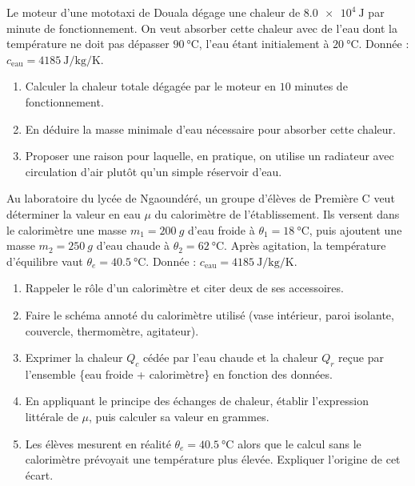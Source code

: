 \documentclass[11pt]{article}
\newcounter{popsec}
\newcounter{popsub}
\newcommand{\courssub}[1]{%
  \stepcounter{popsub}%
  \par\vspace{9pt}\noindent{\popxbold\fontsize{11.5}{13}\selectfont\color{popink}{\color{poporange}\thepopsec.\thepopsub}\hspace{6pt}#1}\par\nopagebreak\vspace{4pt}
}
\begin{document}
\begin{exercice}
Le moteur d'une mototaxi de Douala dégage une chaleur de $\SI{8,0e4}{\joule}$ par minute de fonctionnement. On veut absorber cette chaleur avec de l'eau dont la température ne doit pas dépasser $\SI{90}{\celsius}$, l'eau étant initialement à $\SI{20}{\celsius}$.
Donnée : $c_{\text{eau}} = \SI{4185}{\joule\per\kilogram\per\kelvin}$.
\begin{enumerate}
\item Calculer la chaleur totale dégagée par le moteur en $10$ minutes de fonctionnement.
\item En déduire la masse minimale d'eau nécessaire pour absorber cette chaleur.
\item Proposer une raison pour laquelle, en pratique, on utilise un radiateur avec circulation d'air plutôt qu'un simple réservoir d'eau.
\end{enumerate}
\end{exercice}

\courssub{Je me prépare au Probatoire}

\begin{exercice}
Au laboratoire du lycée de Ngaoundéré, un groupe d'élèves de Première C veut déterminer la valeur en eau $\mu$ du calorimètre de l'établissement. Ils versent dans le calorimètre une masse $m_1 = \SI{200}{g}$ d'eau froide à $\theta_1 = \SI{18}{\celsius}$, puis ajoutent une masse $m_2 = \SI{250}{g}$ d'eau chaude à $\theta_2 = \SI{62}{\celsius}$. Après agitation, la température d'équilibre vaut $\theta_e = \SI{40,5}{\celsius}$.
Donnée : $c_{\text{eau}} = \SI{4185}{\joule\per\kilogram\per\kelvin}$.
\begin{enumerate}
\item Rappeler le rôle d'un calorimètre et citer deux de ses accessoires.
\item Faire le schéma annoté du calorimètre utilisé (vase intérieur, paroi isolante, couvercle, thermomètre, agitateur).
\item Exprimer la chaleur $Q_c$ cédée par l'eau chaude et la chaleur $Q_r$ reçue par l'ensemble \{eau froide + calorimètre\} en fonction des données.
\item En appliquant le principe des échanges de chaleur, établir l'expression littérale de $\mu$, puis calculer sa valeur en grammes.
\item Les élèves mesurent en réalité $\theta_e = \SI{40,5}{\celsius}$ alors que le calcul sans le calorimètre prévoyait une température plus élevée. Expliquer l'origine de cet écart.
\end{enumerate}
\end{exercice}
\end{document}

